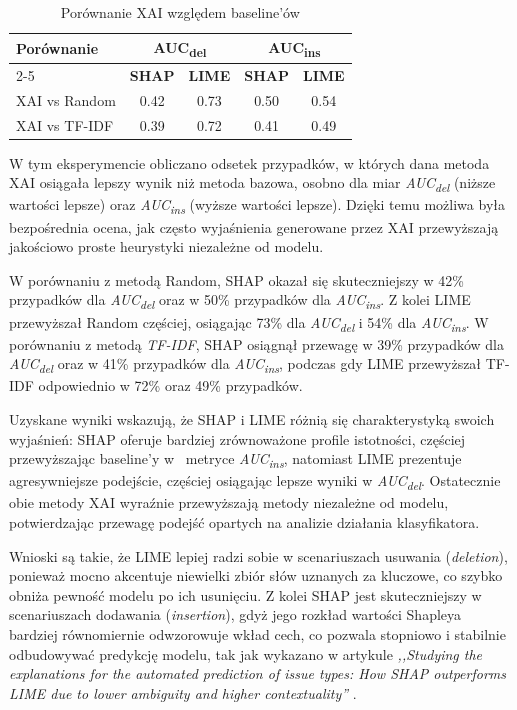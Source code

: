 \documentclass[wmii, inf, mgr]{uwmthesis}
\begin{document}
\begin{table}[H]
	\centering
	\renewcommand{\arraystretch}{1.3}
	\begin{tabular}{|l|c|c|c|c|}
		\hline
		\textbf{Porównanie} & \multicolumn{2}{c|}{\textbf{AUC\textsubscript{del}}} & \multicolumn{2}{c|}{\textbf{AUC\textsubscript{ins}}} \\ \cline{2-5}
		& \textbf{SHAP} & \textbf{LIME} & \textbf{SHAP} & \textbf{LIME} \\ \hline
		XAI vs Random & 0.42 & 0.73 & 0.50 & 0.54 \\ \hline
		XAI vs TF-IDF & 0.39 & 0.72 & 0.41 & 0.49 \\ \hline
	\end{tabular}
	\caption{Porównanie XAI względem baseline’ów}
	\label{tab:xai_vs_baselines}
\end{table}


W tym eksperymencie obliczano odsetek przypadków, w których dana metoda XAI osiągała lepszy wynik niż metoda bazowa, osobno dla miar \textit{AUC\textsubscript{del}} (niższe wartości lepsze) oraz \textit{AUC\textsubscript{ins}} (wyższe wartości lepsze). Dzięki temu możliwa była bezpośrednia ocena, jak często wyjaśnienia generowane przez XAI przewyższają jakościowo proste heurystyki niezależne od modelu.

W porównaniu z metodą Random, SHAP okazał się skuteczniejszy w 42\% przypadków dla \textit{AUC\textsubscript{del}} oraz w 50\% przypadków dla \textit{AUC\textsubscript{ins}}. Z kolei LIME przewyższał Random częściej, osiągając 73\% dla \textit{AUC\textsubscript{del}} i 54\% dla \textit{AUC\textsubscript{ins}}. W porównaniu z metodą \textit{TF-IDF}, SHAP osiągnął przewagę w 39\% przypadków dla \textit{AUC\textsubscript{del}} oraz w 41\% przypadków dla \textit{AUC\textsubscript{ins}}, podczas gdy LIME przewyższał TF-IDF odpowiednio w 72\% oraz 49\% przypadków. 

Uzyskane wyniki wskazują, że SHAP i LIME różnią się charakterystyką swoich wyjaśnień: SHAP oferuje bardziej zrównoważone profile istotności, częściej przewyższając baseline’y w~ metryce \textit{AUC\textsubscript{ins}}, natomiast LIME prezentuje agresywniejsze podejście, częściej osiągając lepsze wyniki w \textit{AUC\textsubscript{del}}. Ostatecznie obie metody XAI wyraźnie przewyższają metody niezależne od modelu, potwierdzając przewagę podejść opartych na analizie działania klasyfikatora.

Wnioski są takie, że LIME lepiej radzi sobie w scenariuszach usuwania (\textit{deletion}), ponieważ mocno akcentuje niewielki zbiór słów uznanych za kluczowe, co szybko obniża pewność modelu po ich usunięciu. Z kolei SHAP jest skuteczniejszy w scenariuszach dodawania (\textit{insertion}), gdyż jego rozkład wartości Shapleya bardziej równomiernie odwzorowuje wkład cech, co pozwala stopniowo i stabilnie odbudowywać predykcję modelu, tak jak wykazano w artykule \textit{,,Studying the explanations for the automated prediction of issue types: How SHAP outperforms LIME due to lower ambiguity and higher contextuality''} \cite{schulte2024}.
\end{document}
